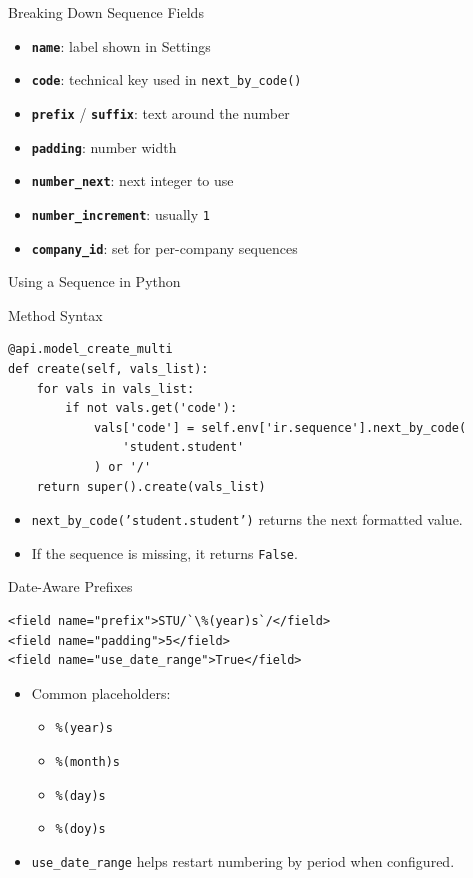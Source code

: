 \begin{frame}[fragile]{Breaking Down Sequence Fields}
	\begin{itemize}
		\item \textbf{\texttt{name}}: label shown in Settings
		\item \textbf{\texttt{code}}: technical key used in \texttt{next\_by\_code()}
		\item \textbf{\texttt{prefix}} / \textbf{\texttt{suffix}}: text around the number
		\item \textbf{\texttt{padding}}: number width
		\item \textbf{\texttt{number\_next}}: next integer to use
		\item \textbf{\texttt{number\_increment}}: usually \texttt{1}
		\item \textbf{\texttt{company\_id}}: set for per-company sequences
	\end{itemize}
\end{frame}

\begin{frame}[fragile]{Using a Sequence in Python}
\begin{block}{Method Syntax}
\begin{lstlisting}
@api.model_create_multi
def create(self, vals_list):
	for vals in vals_list:
		if not vals.get('code'):
			vals['code'] = self.env['ir.sequence'].next_by_code(
				'student.student'
			) or '/'
	return super().create(vals_list)
\end{lstlisting}
\end{block}
	\begin{itemize}
		\item \texttt{next\_by\_code('student.student')} returns the next formatted value.
		\item If the sequence is missing, it returns \texttt{False}.
	\end{itemize}
\end{frame}

\begin{frame}[fragile]{Date-Aware Prefixes}
\begin{lstlisting}[style=xml,escapeinside=``]
<field name="prefix">STU/`\%(year)s`/</field>
<field name="padding">5</field>
<field name="use_date_range">True</field>
\end{lstlisting}
	\begin{itemize}
		\item Common placeholders:
		\begin{itemize}
			\item \texttt{\%(year)s}
			\item \texttt{\%(month)s}
			\item \texttt{\%(day)s}
			\item \texttt{\%(doy)s}
		\end{itemize}
		\item \texttt{use\_date\_range} helps restart numbering by period when configured.
	\end{itemize}
\end{frame}


